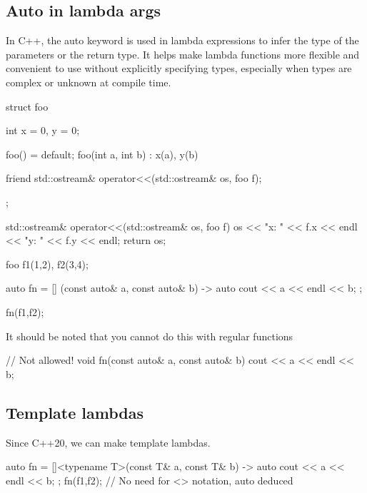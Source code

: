 \documentclass{report}
\begin{document}
     \pagebreak 
     \bigbreak \noindent 
     \subsection{Auto in lambda args}
     \bigbreak \noindent 
     In C++, the auto keyword is used in lambda expressions to infer the type of the parameters or the return type. It helps make lambda functions more flexible and convenient to use without explicitly specifying types, especially when types are complex or unknown at compile time.
     \bigbreak \noindent 
     \begin{cppcode}
         struct foo {
             int x = 0, y = 0;

             foo() = default;
             foo(int a, int b) : x(a), y(b) {}

             friend std::ostream& operator<<(std::ostream& os, foo f);
         };

         std::ostream& operator<<(std::ostream& os, foo f) {
             os << "x: " << f.x << endl << "y: " << f.y << endl;
             return os;
         }

         foo f1(1,2), f2(3,4);

         auto fn = [] (const auto& a, const auto& b) -> auto {
             cout << a << endl << b;
         };

         fn(f1,f2);
     \end{cppcode}
     \bigbreak \noindent 
     It should be noted that you cannot do this with regular functions
     \bigbreak \noindent 
     \begin{cppcode}
         // Not allowed!
         void fn(const auto& a, const auto& b) { 
             cout << a << endl << b;
         }
     \end{cppcode}


     \subsection{Template lambdas}
     \bigbreak \noindent 
     Since C++20, we can make template lambdas.
     \bigbreak \noindent 
     \begin{cppcode}
         auto fn = []<typename T>(const T& a, const T& b) -> auto{
             cout << a << endl << b;
         };
         fn(f1,f2); // No need for <> notation, auto deduced
     \end{cppcode}
     

     \pagebreak 
\end{document}
